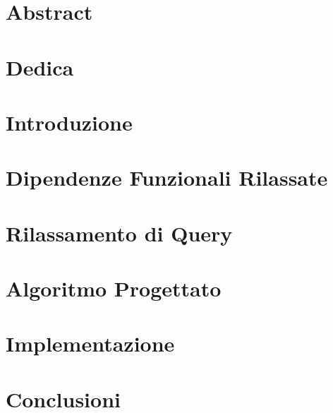 \documentclass[12pt,oneside]{report}
\begin{document}
\begin{titlepage}

\end{titlepage}
\chapter*{Abstract}

\tableofcontents
\listoftables
\renewcommand\listoflistingscaption{Elenco degli snippet di codice}
\listoflistings

\chapter*{Dedica}

\chapter{Introduzione}


\chapter{Dipendenze Funzionali Rilassate}


\chapter{Rilassamento di Query}


\chapter{Algoritmo Progettato}


\chapter{Implementazione}


\chapter{Conclusioni}




\end{document}
